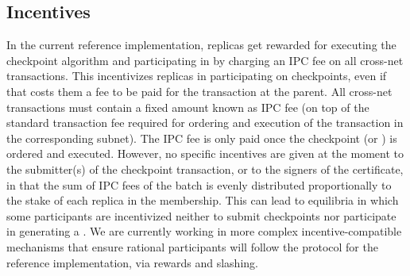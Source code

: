 \subsection{Incentives} 
\label{sec:refimplincentives}
In the current reference implementation, replicas get rewarded for executing the checkpoint algorithm and participating in \tcheckpoint by charging an IPC fee on all cross-net transactions. This incentivizes replicas in participating on checkpoints, even if that costs them a fee to be paid for the transaction at the parent. All cross-net transactions must contain a fixed amount known as IPC fee (on top of the standard transaction fee required for ordering and execution of the transaction in the corresponding subnet). The IPC fee is only paid once the checkpoint (or \tcheckpoint) is ordered and executed. However, no specific incentives are given at the moment to the submitter(s) of the checkpoint transaction, or to the signers of the certificate, in that the sum of IPC fees of the batch is evenly distributed proportionally to the stake of each replica in the membership. This can lead to equilibria in which some participants are incentivized neither to submit checkpoints nor participate in generating a 
\pof. We are currently working in more complex incentive-compatible mechanisms that ensure rational participants will follow the protocol for the reference implementation, via rewards and slashing.

